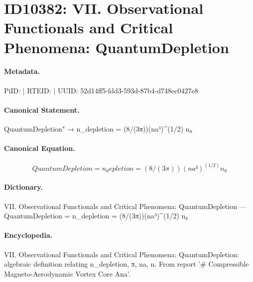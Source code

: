 \section*{ID10382: VII. Observational Functionals and Critical Phenomena: QuantumDepletion}
\paragraph{Metadata.}
PiID:  | RTEID:  | UUID: 52d14ff5-fdd3-593d-87b4-d748ec0427e8

\paragraph{Canonical Statement.}
QuantumDepletion" → n\_depletion = (8/(3π))(na³)\textasciicircum{}(1/2) n₀

\paragraph{Canonical Equation.}
\[
QuantumDepletion = n_depletion = (8/(3π))(na³)^(1/2) n₀
\]

\paragraph{Dictionary.}
VII. Observational Functionals and Critical Phenomena: QuantumDepletion — QuantumDepletion = n\_depletion = (8/(3π))(na³)\textasciicircum{}(1/2) n₀

\paragraph{Encyclopedia.}
VII. Observational Functionals and Critical Phenomena: QuantumDepletion: algebraic definition relating n\_depletion, π, na, n. From report '\# Compressible Magneto-Aerodynamic Vortex Core Ana'.
